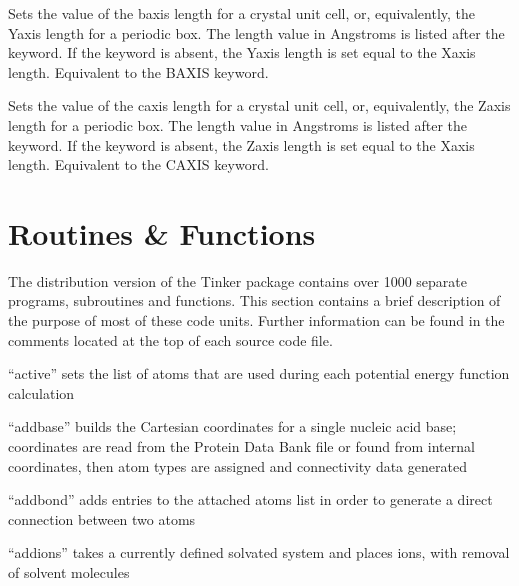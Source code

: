 \documentclass[letterpaper,11pt,english]{sphinxmanual}
\begin{document}
  Sets the value of the b\sphinxhyphen{}axis length for a crystal unit cell, or, equivalently, the Y\sphinxhyphen{}axis length for a periodic box. The length value in Angstroms is listed after the keyword. If the keyword is absent, the Y\sphinxhyphen{}axis length is set equal to the X\sphinxhyphen{}axis length. Equivalent to the B\sphinxhyphen{}AXIS keyword.

  Sets the value of the c\sphinxhyphen{}axis length for a crystal unit cell, or, equivalently, the Z\sphinxhyphen{}axis length for a periodic box. The length value in Angstroms is listed after the keyword. If the keyword is absent, the Z\sphinxhyphen{}axis length is set equal to the X\sphinxhyphen{}axis length. Equivalent to the C\sphinxhyphen{}AXIS keyword.


\chapter{Routines \& Functions}
\label{\detokenize{text/routines:routines-functions}}\label{\detokenize{text/routines::doc}}
The distribution version of the Tinker package contains over 1000 separate programs, subroutines and functions. This section contains a brief description of the purpose of most of these code units. Further information can be found in the comments located at the top of each source code file.


“active” sets the list of atoms that are used during
each potential energy function calculation


“addbase” builds the Cartesian coordinates for a single nucleic
acid base; coordinates are read from the Protein Data Bank file
or found from internal coordinates, then atom types are assigned
and connectivity data generated


“addbond” adds entries to the attached atoms list in
order to generate a direct connection between two atoms


“addions” takes a currently defined solvated system and
places ions, with removal of solvent molecules

\end{document}
